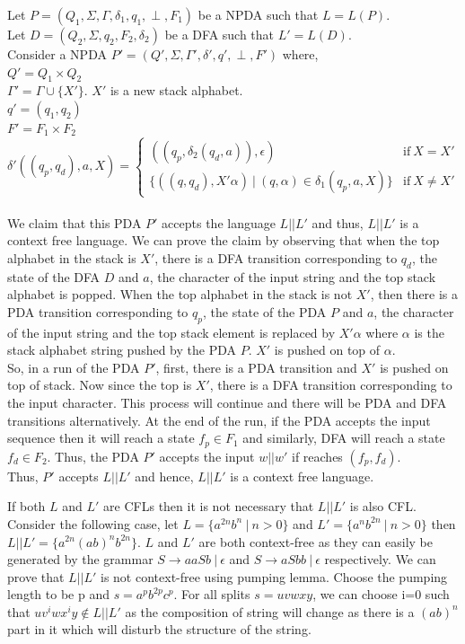 \documentclass[11pt]{article}
\begin{document}
\begin{enumerate}
	Let $P = (Q_1,\Sigma,\Gamma,\delta_1,q_1,\perp,F_1)$ be a NPDA such that $L = L(P)$. \\ Let $D = (Q_2,\Sigma,q_2,F_2,\delta_2)$ be a DFA such that $L' = L(D)$.\\
	Consider a NPDA $P' = (Q',\Sigma,\Gamma',\delta',q',\perp,F')$ where,\\
	$Q' = Q_1 \times Q_2$ \\
	$\Gamma' = \Gamma \cup \{X'\}$. $X'$ is a new stack alphabet.\\
 	$ q' = (q_1,q_2)$ \\
	$ F' = F_1 \times F_2$ \\
    $ \delta' ( (q_p,q_d), a, X ) =
	\begin{cases}
    ( ( q_p , \delta_2( q_d , a ) ) , \epsilon ) & \text{if}\ X = X' \\ 
	\{( ( q , q_d ) , X'\alpha )\ |\ (q,\alpha) \in \delta_1(q_p,a,X) \} & \text{if}\ X \neq X' 
	\end{cases}$ \\ \\
	We claim that this PDA $P'$ accepts the language $L||L'$ and thus, $L || L'$ is a context free language. We can prove the claim by observing that when the top alphabet in the stack is $X'$, there is a DFA transition corresponding to $q_d$, the state of the DFA $D$ and $a$, the character of the input string and the top stack alphabet is popped. When the top alphabet in the stack is not $X'$, then there is a PDA transition corresponding to $q_p$, the state of the PDA $P$ and $a$, the character of the input string and the top stack element is replaced by $X'\alpha$ where $\alpha$ is the stack alphabet string pushed by the PDA $P$. $X'$ is pushed on top of $\alpha$.\\
	So, in a run of the PDA $P'$, first, there is a PDA transition and $X'$ is pushed on top of stack. Now since the top is $X'$, there is a DFA transition corresponding to the input character. This process will continue and there will be PDA and DFA transitions alternatively. At the end of the run, if the PDA accepts the input sequence then it will reach a state $f_p \in F_1$ and similarly, DFA will reach a state $f_d \in F_2$. Thus, the PDA $P'$ accepts the input $w||w'$ if reaches $(f_p,f_d)$.\\
	Thus, $P'$ accepts $L||L'$ and hence, $L||L'$ is a context free language. \hfill\qedsymbol
	
    If both $L$ and $L'$ are CFLs then it is not necessary that $L||L'$ is also CFL. Consider the following case, let $L = \{ a^{2n} b^{n}\ |\ n > 0\}$ and 
    $L' = \{ a^{n} b^{2n}\ |\ n > 0\}$ then $L||L' = \{ a^{2n} (ab)^{n} b^{2n} \}$. $L$ and $L'$ are both context-free as they can easily be generated by the grammar $S \rightarrow aaSb\ |\ \epsilon$ and $S \rightarrow aSbb\ |\ \epsilon$ respectively. We can prove that $L||L'$ is not context-free using pumping lemma. Choose the pumping length to be p and $s = a^p b^{2p} c^p$. For all splits $s = uvwxy$, we can choose i=0 such that $uv^iwx^iy \notin L||L'$ as the composition of string will change as there is a $(ab)^n$ part in it which will disturb the structure of the string.
	

\end{enumerate}
\end{document}
